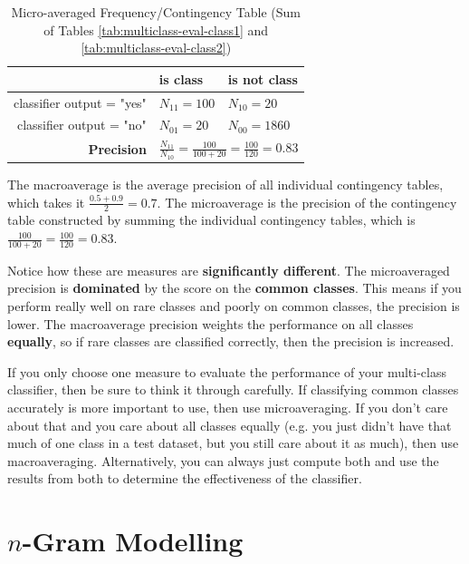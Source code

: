 \documentclass{article}
\begin{document}
\begin{table}[H]
	\centering
	\begin{tabular}{|r|l|l|}
		\hline
		& is class & is not class \\
		\hline
		classifier output = "yes" & $N_{11} = 100$ & $N_{10} = 20$ \\
		classifier output = "no" & $N_{01} = 20$ & $N_{00} = 1860$ \\
		\hline
		\textbf{Precision} & \multicolumn{2}{l|}{
			$\frac{N_{11}}{N_{10}} = \frac{100}{100 + 20} = \frac{100}{120} = 0.83$
		} \\
		\hline
	\end{tabular}
	\caption{Micro-averaged Frequency/Contingency Table (Sum of Tables \ref {tab:multiclass-eval-class1} and \ref{tab:multiclass-eval-class2})}
	\label{tab:multiclass-eval-classsum}
\end{table}

The macroaverage is the average precision of all individual contingency tables, which takes it $\frac{0.5 + 0.9}{2} = 0.7$. The microaverage is the precision of the contingency table constructed by summing the individual contingency tables, which is $\frac{100}{100 + 20} = \frac{100}{120} = 0.83$.

Notice how these are measures are \textbf{significantly different}. The microaveraged precision is \textbf{dominated} by the score on the \textbf{common classes}. This means if you perform really well on rare classes and poorly on common classes, the precision is lower. The macroaverage precision weights the performance on all classes \textbf{equally}, so if rare classes are classified correctly, then the precision is increased.

If you only choose one measure to evaluate the performance of your multi-class classifier, then be sure to think it through carefully. If classifying common classes accurately is more important to use, then use microaveraging. If you don't care about that and you care about all classes equally (e.g. you just didn't have that much of one class in a test dataset, but you still care about it as much), then use macroaveraging. Alternatively, you can always just compute both and use the results from both to determine the effectiveness of the classifier.

\section{$n$-Gram Modelling}
\label{sec:ngram-modelling}
\end{document}
